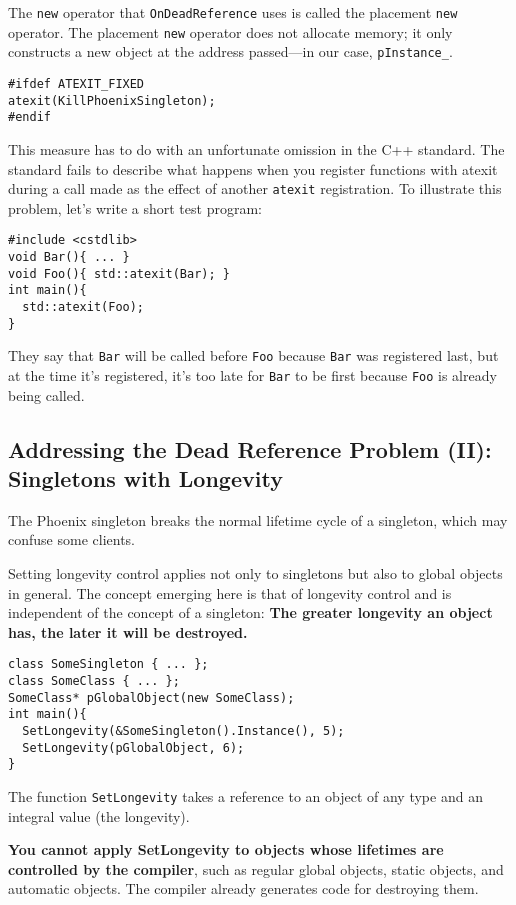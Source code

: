 The \texttt{new} operator that \texttt{OnDeadReference} uses is called
the placement \texttt{new} operator. The placement \texttt{new}
operator does not allocate memory; it only constructs a new object at
the address passed—in our case, \texttt{pInstance\_}.

\begin{verbatim}
#ifdef ATEXIT_FIXED
atexit(KillPhoenixSingleton);
#endif
\end{verbatim}

This measure has to do with an unfortunate omission in the C++
standard. The standard fails to describe what happens when you
register functions with atexit during a call made as the effect of
another \texttt{atexit} registration. To illustrate this problem,
let's write a short test program: 
\begin{verbatim}
#include <cstdlib>
void Bar(){ ... }
void Foo(){ std::atexit(Bar); }
int main(){
  std::atexit(Foo);
}
\end{verbatim}

They say that \texttt{Bar} will be called before \texttt{Foo} because
\texttt{Bar} was registered last, but at  the time it's registered,
it's too late for \texttt{Bar} to be first because \texttt{Foo} is
already being called.

\subsection{Addressing the Dead Reference Problem (II):
  Singletons with Longevity}

The Phoenix singleton breaks the normal lifetime cycle of a singleton,
which may confuse some clients.

Setting longevity control applies not only to singletons but also to
global objects in general. The concept emerging here is that of
longevity control and is independent of the concept of a singleton: 
\textbf{The greater longevity an object has, the later it will be
  destroyed. }

\begin{verbatim}
class SomeSingleton { ... };
class SomeClass { ... };
SomeClass* pGlobalObject(new SomeClass);
int main(){
  SetLongevity(&SomeSingleton().Instance(), 5);
  SetLongevity(pGlobalObject, 6);
}
\end{verbatim}
The function \texttt{SetLongevity} takes a reference to an object of
any type and an integral value (the longevity).

\textbf{You cannot apply SetLongevity to objects whose lifetimes are
  controlled by the compiler}, such as regular global objects, static
objects, and automatic objects. The compiler already generates code
for destroying them.

